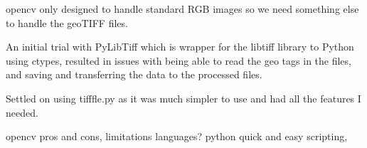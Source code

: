 
opencv only designed to handle standard RGB images so we need something else to handle the geoTIFF files.

An initial trial with PyLibTiff \cite{pylibtiff} which is wrapper for the libtiff library to Python using ctypes, resulted in issues with being able to read the geo tags in the files, and saving and transferring the data to the processed files.

Settled on using tifffle.py \cite{tifffle} as it was much simpler to use and had all the features I needed.


opencv pros and cons, limitations
languages? python quick and easy scripting, 


